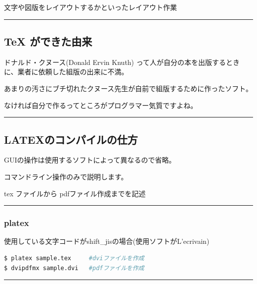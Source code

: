 文字や図版をレイアウトするかといったレイアウト作業

\begin{center}\rule{0.5\linewidth}{\linethickness}\end{center}

\hypertarget{tex-ux304cux3067ux304dux305fux7531ux6765}{\subsection{TeX
ができた由来}\label{tex-ux304cux3067ux304dux305fux7531ux6765}}

ドナルド・クヌース(Donald Ervin Knuth)
って人が自分の本を出版するときに、業者に依頼した組版の出来に不満。

あまりの汚さにブチ切れたクヌース先生が自前で組版するために作ったソフト。

なければ自分で作るってところがプログラマー気質ですよね。

\begin{center}\rule{0.5\linewidth}{\linethickness}\end{center}

\hypertarget{latexux306eux30b3ux30f3ux30d1ux30a4ux30ebux306eux4ed5ux65b9}{\subsection{LATEXのコンパイルの仕方}\label{latexux306eux30b3ux30f3ux30d1ux30a4ux30ebux306eux4ed5ux65b9}}

GUIの操作は使用するソフトによって異なるので省略。

コマンドライン操作のみで説明します。

tex ファイルから pdfファイル作成までを記述

\begin{center}\rule{0.5\linewidth}{\linethickness}\end{center}

\subsubsection{platex}\label{platex}

使用している文字コードがshift\_jisの場合(使用ソフトがL'ecrivain)

\begin{lstlisting}[language=bash]
$ platex sample.tex     #dviファイルを作成
$ dvipdfmx sample.dvi   #pdfファイルを作成
\end{lstlisting}

\begin{center}\rule{0.5\linewidth}{\linethickness}\end{center}

